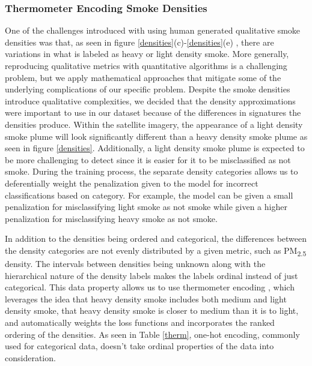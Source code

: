 \subsubsection{Thermometer Encoding Smoke Densities}

One of the challenges introduced with using human generated qualitative smoke densities was that, as seen in figure \ref{densities}(c)-\ref{densities}(e) , there are variations in what is labeled as heavy or light density smoke. More generally, reproducing qualitative metrics with quantitative algorithms is a challenging problem, but we apply mathematical approaches that mitigate some of the underlying complications of our specific problem. Despite the smoke densities introduce qualitative complexities, we decided that the density approximations were important to use in our dataset because of the differences in signatures the densities produce. Within the satellite imagery, the appearance of a light density smoke plume will look significantly different than a heavy density smoke plume as seen in figure \ref{densities}. Additionally, a light density smoke plume is expected to be more challenging to detect since it is easier for it to be misclassified as not smoke. During the training process, the separate density categories allows us to deferentially weight the penalization given to the model for incorrect classifications based on category. For example, the model can be given a small penalization for misclassifying light smoke as not smoke while given a higher penalization for misclassifying heavy smoke as not smoke. 

In addition to the densities being ordered and categorical, the differences between the density categories are not evenly distributed by a given metric, such as PM\textsubscript{2.5} density. The intervals between densities being unknown along with the hierarchical nature of the density labels makes the labels ordinal instead of just categorical. This data property allows us to use thermometer encoding \cite{therm_enc}, which leverages the idea that heavy density smoke includes both medium and light density smoke, that heavy density smoke is closer to medium than it is to light, and automatically weights the loss functions and incorporates the ranked ordering of the densities. As seen in Table \ref{therm}, one-hot encoding, commonly used for categorical data, doesn't take ordinal properties of the data into consideration.

